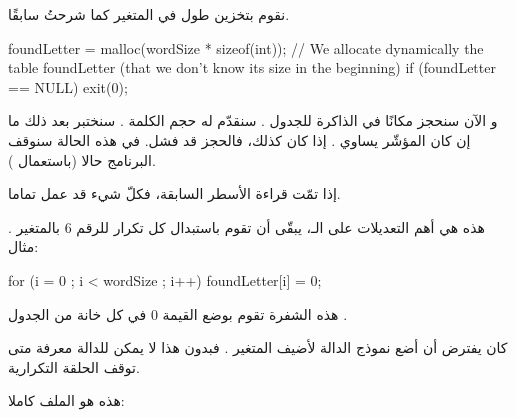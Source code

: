 نقوم بتخزين طول
في المتغير
كما شرحتُ سابقًا.

\begin{Csource}
foundLetter = malloc(wordSize  * sizeof(int)); // We allocate dynamically the table foundLetter (that we don't know its size in the beginning)
if (foundLetter  == NULL)
	 exit(0);
\end{Csource}

و الآن سنحجز مكانًا في الذاكرة للجدول
.
سنقدّم له حجم الكلمة
.
سنختبر بعد ذلك ما إن كان المؤشّر يساوي
.
إذا كان كذلك، فالحجز قد فشل. في هذه الحالة سنوقف البرنامج حالا (باستعمال
).

إذا تمّت قراءة الأسطر السابقة، فكلّ شيء قد عمل تماما.

هذه هي أهم التعديلات على الـ،
يبقّى أن تقوم باستبدال كل تكرار للرقم 6 بالمتغير
.
مثال:

\begin{Csource}
for (i = 0 ; i < wordSize ; i++)
 	foundLetter[i] = 0;
\end{Csource}

هذه الشفرة تقوم بوضع القيمة 0 في كل خانة من الجدول
.

كان يفترض أن أضع نموذج الدالة
لأضيف المتغير
.
فبدون هذا لا يمكن للدالة معرفة متى توقف الحلقة التكرارية.

هذه هو الملف
كاملا:

